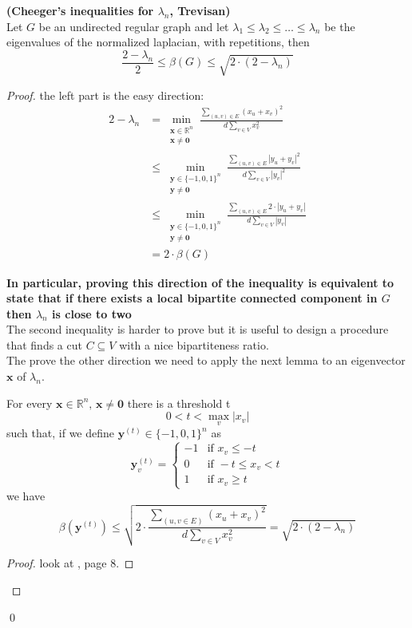 \begin{theorem}{\textbf{(Cheeger's inequalities for $ \lambda_n $, Trevisan)}}
\\
Let $ G $ be an undirected regular graph and let $ \lambda_1 \leq \lambda_2 \leq \dots \leq \lambda_n $ be the eigenvalues of the normalized laplacian, with repetitions, then
\[\frac{2-\lambda_n}{2} \leq \beta(G) \leq \sqrt{2 \cdot (2-\lambda_n)} \] 
\begin{proof}
the left part is the easy direction:
\begin{align*}
 2-\lambda_n & = \min_{\substack{\mathbf{x} \in \mathbb{R}^n \\ \mathbf{x} \ne \mathbf{0}}} \frac{\sum_{(u,v)\in E}(x_u+x_v)^2}{d \sum_{v \in V} x_v^2 } \\
 & \leq \min_{\substack{\mathbf{y} \in \{-1,0,1\}^n \\ \mathbf{y} \ne \mathbf{0}}} \frac{\sum_{(u,v)\in E} |y_u+y_v|^2}{d \sum_{v \in V} |y_v|^2 } \\
 & \leq \min_{\substack{\mathbf{y} \in \{-1,0,1\}^n \\ \mathbf{y} \ne \mathbf{0}}} \frac{\sum_{(u,v)\in E} 2 \cdot |y_u+y_v|}{d \sum_{v \in V} |y_v|} \\
 & = 2 \cdot \beta(G)
\end{align*}
\medskip

\textbf{In particular, proving this direction of the inequality is equivalent to state that if there exists a local bipartite connected component in $ G $ then $ \lambda_n $ is close to two} \\
The second inequality is harder to prove but it is useful to design a procedure that finds a cut $ C \subseteq V $ with a nice bipartiteness ratio.\\
The prove the other direction we need to apply the next lemma to an eigenvector $ \mathbf{x} $ of $ \lambda_n $.
\begin{lemma}[main]
For every $ \mathbf{x} \in \mathbb{R}^n, \,  \mathbf{x} \ne \mathbf{0} $ there is a threshold t \[ 0<t<\max_v |x_v| \] such that, if we define $ \mathbf{y}^{(t)} \in \{-1,0,1\}^n $ as
\begin{equation*}
\mathbf{y}_{v}^{(t)} = \begin{cases}
  -1 & \text{if } x_v \leq -t \\
  0 & \text{if }  -t \leq x_v < t \\
  1 & \text{if } x_v \geq t
 \end{cases}
\end{equation*}
we have
\[ \beta(\mathbf{y}^{(t)}) \leq \sqrt{2 \cdot \frac{\sum_{(u,v \in E)}(x_u+x_v)^2}{d \sum_{v \in V}x_v^2}} = \sqrt{2 \cdot (2-\lambda_n)}\]
\begin{proof}
look at \cite{trevi-1}, page 8.
\end{proof}
\end{lemma}
\end{proof}
\qed
\end{theorem}

